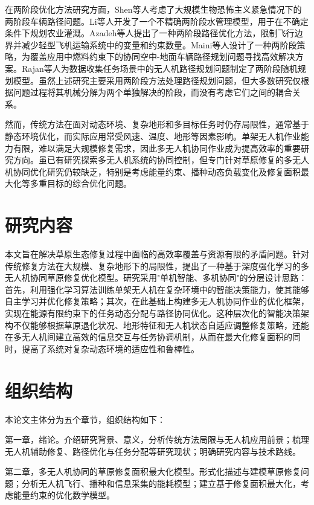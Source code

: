 \documentclass[AutoFakeBold]{LZUThesis}
\begin{document}
在两阶段优化方法研究方面，Shen等人\cite{shen2009two}考虑了大规模生物恐怖主义紧急情况下的两阶段车辆路径问题。Li等人\cite{li2010inexact}开发了一个不精确两阶段水管理模型，用于在不确定条件下规划农业灌溉。Azadeh等人\cite{azadeh2019two}提出了一种两阶段路径优化方法，限制飞行边界并减少轻型飞机运输系统中的变量和约束数量。Maini等人\cite{maini2019cooperative}设计了一种两阶段策略，为覆盖应用中燃料约束下的协同空中-地面车辆路径规划问题寻找高效解决方案。Rajan等人\cite{rajan2022routing}为数据收集任务场景中的无人机路径规划问题制定了两阶段随机规划模型。虽然上述研究主要采用两阶段方法处理路径规划问题，但大多数研究仅根据问题过程将其机械分解为两个单独解决的阶段，而没有考虑它们之间的耦合关系。

然而，传统方法在面对动态环境、复杂地形和多目标任务时仍存局限性\cite{gann2019international}，通常基于静态环境优化，而实际应用常受风速、温度、地形等因素影响。单架无人机作业能力有限，难以满足大规模修复需求，因此多无人机协同作业成为提高效率的重要研究方向\cite{dorling2016vehicle,maini2019cooperative}。虽已有研究探索多无人机系统的协同控制\cite{buters2019seed}，但专门针对草原修复的多无人机协同优化研究仍较缺乏，特别是考虑能量约束、播种动态负载变化及修复面积最大化等多重目标的综合优化问题。

\section{研究内容}
本文旨在解决草原生态修复过程中面临的高效率覆盖与资源有限的矛盾问题。针对传统修复方法在大规模、复杂地形下的局限性，提出了一种基于深度强化学习的多无人机协同草原修复优化模型。研究采用"单机智能、多机协同"的分层设计思路：首先，利用强化学习算法训练单架无人机在复杂环境中的智能决策能力，使其能够自主学习并优化修复策略；其次，在此基础上构建多无人机协同作业的优化框架，实现在能源有限约束下的任务动态分配与路径协同优化。这种层次化的智能决策架构不仅能够根据草原退化状况、地形特征和无人机状态自适应调整修复策略，还能在多无人机间建立高效的信息交互与任务协调机制，从而在最大化修复面积的同时，提高了系统对复杂动态环境的适应性和鲁棒性。

\section{组织结构}

本论文主体分为五个章节，组织结构如下：

第一章，绪论。介绍研究背景、意义，分析传统方法局限与无人机应用前景；梳理无人机辅助修复、路径优化与任务分配等研究现状；明确研究内容与技术路线。

第二章，多无人机协同的草原修复面积最大化模型。形式化描述与建模草原修复问题；分析无人机飞行、播种和信息采集的能耗模型；建立基于修复面积最大化，考虑能量约束的优化数学模型。
\end{document}
